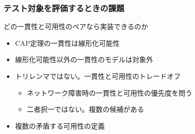 \documentclass[unicode, 14pt, aspectratio=169]{beamer}
\begin{document}
\begin{frame}
  \frametitle{テスト対象を評価するときの課題}
  {\large どの一貫性と可用性のペアなら実装できるのか}
  \begin{description}[font=\normalfont\underline]
  \item[CAP定理の問題]
  \begin{itemize}[leftmargin=0cm,topsep=0pt,before=\leavevmode\vspace{8pt}]
  \item CAP定理\supercite{cap}の一貫性は線形化可能性\supercite{linearizability} 
  \item 線形化可能性以外の一貫性のモデルは対象外
  \item トリレンマではない。一貫性と可用性のトレードオフ\supercite{cap-twelve-years-later}
    \begin{itemize}
    \item ネットワーク障害時の一貫性と可用性の優先度を問う
    \item 二者択一ではない。複数の候補がある
    \end{itemize}
  \item 複数の矛盾する可用性の定義\supercite{kleppmann}    
  \end{itemize}    
  \end{description}

\end{frame}
\end{document}
